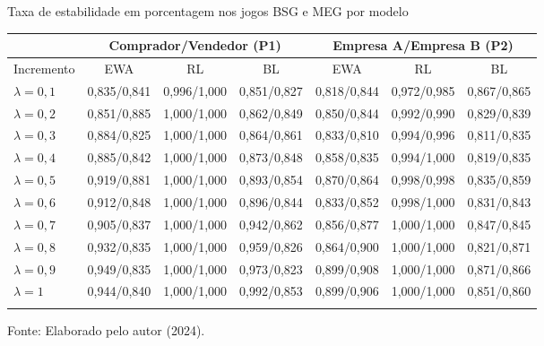 \begin{tabela}[H]
	\small
	\centering
	\caption{Taxa de estabilidade em porcentagem nos jogos BSG e MEG por modelo}
	\begin{tabular}{l|c c c|c c c}
		\Xhline{2\arrayrulewidth}
		& \multicolumn{3}{c|}{Comprador/Vendedor (P1)} & \multicolumn{3}{c}{Empresa A/Empresa B (P2)} \\ 
		\hline
		Incremento & EWA & RL & BL & EWA & RL & BL \\ \hline
		$\lambda = 0,1$ & 0,835/0,841 & 0,996/1,000 & 0,851/0,827 & 0,818/0,844 & 0,972/0,985 & 0,867/0,865 \\
		$\lambda = 0,2$ & 0,851/0,885 & 1,000/1,000 & 0,862/0,849 & 0,850/0,844 & 0,992/0,990 & 0,829/0,839 \\
		$\lambda = 0,3$ & 0,884/0,825 & 1,000/1,000 & 0,864/0,861 & 0,833/0,810 & 0,994/0,996 & 0,811/0,835 \\
		$\lambda = 0,4$ & 0,885/0,842 & 1,000/1,000 & 0,873/0,848 & 0,858/0,835 & 0,994/1,000 & 0,819/0,835 \\
		$\lambda = 0,5$ & 0,919/0,881 & 1,000/1,000 & 0,893/0,854 & 0,870/0,864 & 0,998/0,998 & 0,835/0,859 \\
		$\lambda = 0,6$ & 0,912/0,848 & 1,000/1,000 & 0,896/0,844 & 0,833/0,852 & 0,998/1,000 & 0,831/0,843 \\
		$\lambda = 0,7$ & 0,905/0,837 & 1,000/1,000 & 0,942/0,862 & 0,856/0,877 & 1,000/1,000 & 0,847/0,845 \\
		$\lambda = 0,8$ & 0,932/0,835 & 1,000/1,000 & 0,959/0,826 & 0,864/0,900 & 1,000/1,000 & 0,821/0,871 \\
		$\lambda = 0,9$ & 0,949/0,835 & 1,000/1,000 & 0,973/0,823 & 0,899/0,908 & 1,000/1,000 & 0,871/0,866 \\
		$\lambda = 1$ & 0,944/0,840 & 1,000/1,000 & 0,992/0,853 & 0,899/0,906 & 1,000/1,000 & 0,851/0,860 \\
		\Xhline{2\arrayrulewidth}
	\end{tabular}
	\label{tabela_3}
	\caption*{\fontsize{10}{12}\selectfont Fonte: Elaborado pelo autor (2024).}
\end{tabela}
